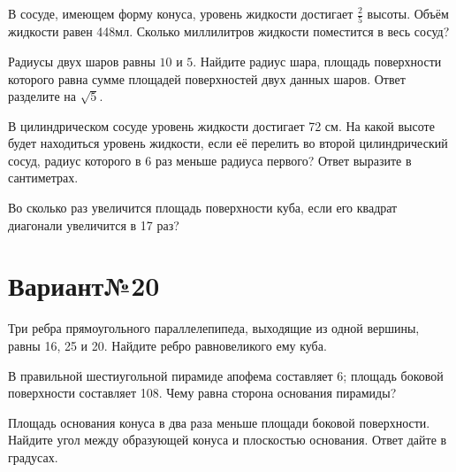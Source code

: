 \documentclass[4apaper]{article}
\begin{document}
\begin{taskBN}{3}
В сосуде, имеющем форму конуса, уровень жидкости достигает $\frac{2}{5}$ высоты. Объём жидкости равен 448мл. Сколько миллилитров жидкости поместится в весь сосуд?
\end{taskBN}

\begin{taskBN}{4}
Радиусы двух шаров равны $10$ и $5$. Найдите радиус шара, площадь поверхности которого равна сумме площадей поверхностей двух данных шаров. Ответ разделите на $\sqrt{5}$.
\end{taskBN}

\begin{taskBN}{5}
В цилиндрическом сосуде уровень жидкости достигает 72 см. На какой высоте будет находиться уровень жидкости, если её перелить во второй цилиндрический сосуд, радиус которого в 6 раз меньше радиуса первого? Ответ выразите в сантиметрах.
\end{taskBN}

\begin{taskBN}{6}
Во сколько раз увеличится площадь поверхности куба, если его квадрат диагонали увеличится в 17 раз?
\end{taskBN}
\newpage\section*{Вариант№20}

\begin{taskBN}{1}
Три ребра прямоугольного параллелепипеда, выходящие из одной вершины, равны 16, 25 и 20. Найдите ребро равновеликого ему куба.
\end{taskBN}

\begin{taskBN}{2}
В правильной шестиугольной пирамиде апофема составляет 6; площадь боковой поверхности составляет 108. Чему равна сторона основания пирамиды?
\end{taskBN}

\begin{taskBN}{3}
Площадь основания конуса в два раза меньше площади боковой поверхности. Найдите угол между образующей конуса и плоскостью основания. Ответ дайте в градусах.
\end{taskBN}
\end{document}
